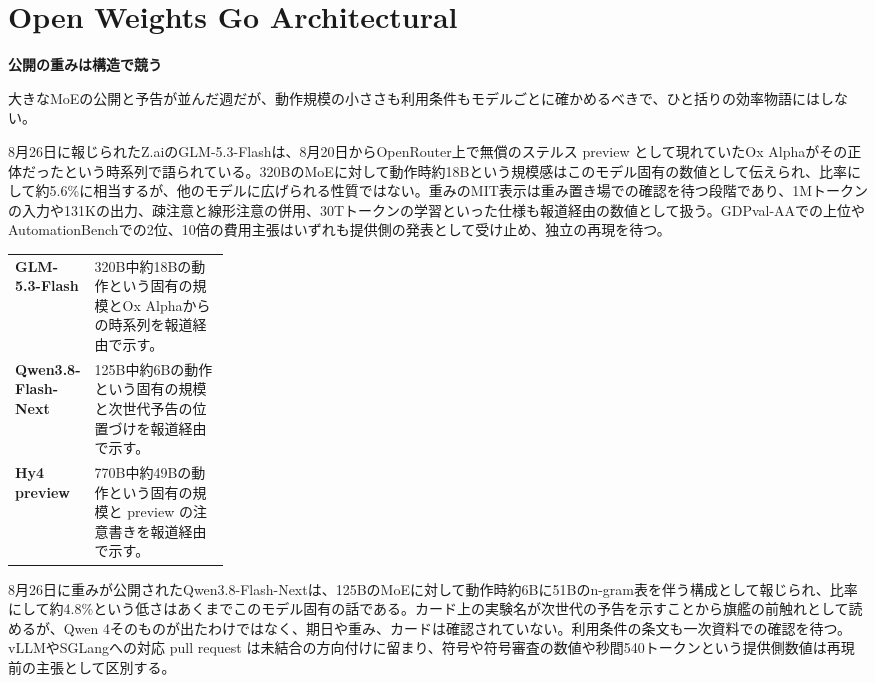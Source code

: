 \section{Open Weights Go Architectural}
\begin{wideflow}
{\Large\bfseries 公開の重みは構造で競う}\par
\smallskip
{\color{SurveyMuted}大きなMoEの公開と予告が並んだ週だが、動作規模の小ささも利用条件もモデルごとに確かめるべきで、ひと括りの効率物語にはしない。}\par
\end{wideflow}

8月26日に報じられたZ.aiのGLM-5.3-Flashは、8月20日からOpenRouter上で無償のステルス preview として現れていたOx Alphaがその正体だったという時系列で語られている\cite{glm53flash}。320BのMoEに対して動作時約18Bという規模感はこのモデル固有の数値として伝えられ、比率にして約5.6\%に相当するが、他のモデルに広げられる性質ではない。重みのMIT表示は重み置き場での確認を待つ段階であり、1Mトークンの入力や131Kの出力、疎注意と線形注意の併用、30Tトークンの学習といった仕様も報道経由の数値として扱う。GDPval-AAでの上位やAutomationBenchでの2位、10倍の費用主張はいずれも提供側の発表として受け止め、独立の再現を待つ。

\begin{themeoverview}[三つの公開と一つの読み方]
\begin{tabularx}{\linewidth}{@{}>{\bfseries}p{0.25\linewidth}X@{}}
GLM-5.3-Flash & 320B中約18Bの動作という固有の規模とOx Alphaからの時系列を報道経由で示す\cite{glm53flash}。\\
Qwen3.8-Flash-Next & 125B中約6Bの動作という固有の規模と次世代予告の位置づけを報道経由で示す\cite{qwen38flash}。\\
Hy4 preview & 770B中約49Bの動作という固有の規模と preview の注意書きを報道経由で示す\cite{hy4preview}。\\
\end{tabularx}
\end{themeoverview}

8月26日に重みが公開されたQwen3.8-Flash-Nextは、125BのMoEに対して動作時約6Bに51Bのn-gram表を伴う構成として報じられ、比率にして約4.8\%という低さはあくまでこのモデル固有の話である\cite{qwen38flash}。カード上の実験名が次世代の予告を示すことから旗艦の前触れとして読めるが、Qwen 4そのものが出たわけではなく、期日や重み、カードは確認されていない。利用条件の条文も一次資料での確認を待つ。vLLMやSGLangへの対応 pull request は未結合の方向付けに留まり、符号や符号審査の数値や秒間540トークンという提供側数値は再現前の主張として区別する。

